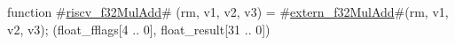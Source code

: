 function #\hyperref[sailRISCVzriscvzyf32MulAdd]{riscv\_f32MulAdd}# (rm, v1, v2, v3) = {
  #\hyperref[sailRISCVzexternzyf32MulAdd]{extern\_f32MulAdd}#(rm, v1, v2, v3);
  (float_fflags[4 .. 0], float_result[31 .. 0])
}
